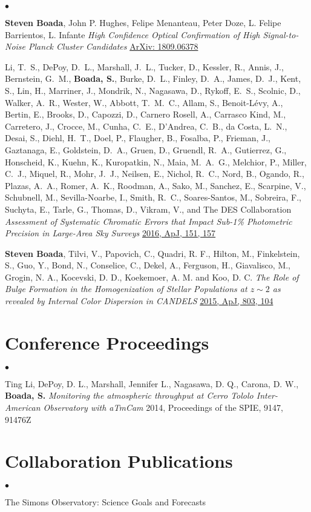 \documentclass[margin,line, 11pt]{res}
\newenvironment{list2}{
  \begin{list}{$\bullet$}{%
      \setlength{\itemsep}{0in}
      \setlength{\parsep}{0in} \setlength{\parskip}{0in}
      \setlength{\topsep}{0in} \setlength{\partopsep}{0in}
      \setlength{\leftmargin}{0.2in}}}{\end{list}}
\begin{document}
\begin{resume}
\begin{list2}
\item \textbf{Steven Boada}, John P. Hughes, Felipe Menanteau, Peter Doze, L. Felipe Barrientos, L. Infante \emph{High Confidence Optical Confirmation of High Signal-to-Noise Planck Cluster Candidates} \href{http://arxiv.org/abs/1809.06378}{ArXiv: 1809.06378}

\item Li, T.~S., DePoy, D.~L., Marshall, J.~L., Tucker, D., Kessler, R., Annis, J.,
Bernstein, G.~M., \textbf{Boada, S.}, Burke, D.~L., Finley, D.~A., James, D.~J., Kent, S.,
Lin, H., Marriner, J., Mondrik, N., Nagasawa, D., Rykoff, E.~S., Scolnic, D., Walker, A.~R.,
Wester, W., Abbott, T.~M.~C., Allam, S., Benoit-L\'evy, A., Bertin, E., Brooks, D., Capozzi,
D., Carnero Rosell, A., Carrasco Kind, M., Carretero, J., Crocce, M., Cunha, C.~E.,
D'Andrea, C.~B., da Costa, L.~N., Desai, S., Diehl, H.~T., Doel, P., Flaugher, B., Fosalba,
P., Frieman, J., Gaztanaga, E., Goldstein, D.~A., Gruen, D., Gruendl, R.~A., Gutierrez, G.,
Honscheid, K., Kuehn, K., Kuropatkin, N., Maia, M.~A.~G., Melchior, P., Miller, C.~J.,
Miquel, R., Mohr, J.~J., Neilsen, E., Nichol, R.~C., Nord, B., Ogando, R., Plazas, A.~A.,
Romer, A.~K., Roodman, A., Sako, M., Sanchez, E., Scarpine, V., Schubnell, M.,
Sevilla-Noarbe, I., Smith, R.~C., Soares-Santos, M., Sobreira, F., Suchyta, E., Tarle, G.,
Thomas, D., Vikram, V., and The DES Collaboration \emph{Assessment of Systematic Chromatic
Errors that Impact Sub-1\% Photometric Precision in Large-Area Sky Surveys} \href{http://adsabs.harvard.edu/abs/2016AJ....151..157L}{2016, ApJ, 151, 157}

\item \textbf{Steven Boada}, Tilvi, V., Papovich, C., Quadri, R. F., Hilton, M., Finkelstein, S., Guo, Y., Bond, N., Conselice, C., Dekel, A., Ferguson, H., Giavalisco, M., Grogin, N. A., Kocevski, D. D., Koekemoer, A. M. and Koo, D. C. \emph{The Role of Bulge Formation in the Homogenization of Stellar Populations at $z\sim2$ as revealed by Internal Color Dispersion in CANDELS} \href{http://adsabs.harvard.edu/abs/2015ApJ...803..104B}{2015, ApJ, 803, 104}
\end{list2}

\section{Conference Proceedings}
\begin{list2}
\item Ting Li, DePoy, D. L., Marshall, Jennifer L., Nagasawa, D. Q., Carona, D. W., {\bf Boada, S.} \emph{Monitoring the atmospheric throughput at Cerro Tololo Inter-American Observatory with aTmCam} 2014, Proceedings of the SPIE, 9147, 91476Z
\end{list2}

\section{Collaboration Publications}
\begin{list2}
  \item The Simons Observatory: Science Goals and Forecasts
\end{list2}

\end{resume}
\end{document}
